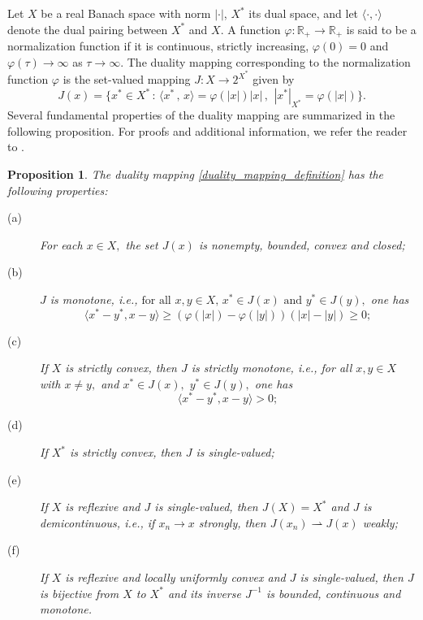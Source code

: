 \documentclass{birkjour}
\newtheorem{proposition}[theorem]{Proposition}
\theoremstyle{definition}
\theoremstyle{remark}
\numberwithin{equation}{section}
\begin{document}
Let $X$ be a real Banach space with norm $\left\vert \cdot \right\vert $, $%
X^{\ast }$ its dual space, and let $\langle \cdot ,\cdot \rangle $ denote
the dual pairing between $X^{\ast }$ and $X$. A function $\varphi \colon
\mathbb{R}_{+}\rightarrow \mathbb{R}_{+}$ is said to be a normalization
function if it is continuous, strictly increasing, $\varphi \left( 0\right)
=0$ and $\varphi \left( \tau \right) \rightarrow \infty $ as $\tau
\rightarrow \infty .$ The duality mapping corresponding to the normalization
function $\varphi $ is the set-valued mapping $J:X\rightarrow 2^{X^{\ast }}$
given by
\begin{equation}
J\left( x\right) =\{x^{\ast }\in X^{\ast }\,:\,\langle x^{\ast
}\,,\,x\rangle =\varphi (|x|)|x|\,,\ \,|x^{\ast }|_{X^{\ast }}=\varphi
(|x|)\}.  \label{duality_mapping_definition}
\end{equation}%
Several fundamental properties of the duality mapping are summarized in the
following proposition. For proofs and additional information, we refer the
reader to \cite{ic,djm,d}.

\begin{proposition}
\label{pdm} The duality mapping \eqref{duality_mapping_definition} has the
following properties:

\begin{description}
\item[(a)] For each $x\in X,$ the set $J\left( x\right) $ is nonempty,
bounded, convex and closed;

\item[(b)] $J$ is monotone, i.e., $\text{for all }x,y\in X,\,x^{\ast }\in
J(x)\text{ and }y^{\ast }\in J(y),$ one has
\begin{equation*}
\langle x^{\ast }-y^{\ast },x-y\rangle \geq \left( \varphi \left( \left\vert
x\right\vert \right) -\varphi \left( \left\vert y\right\vert \right) \right)
\left( \left\vert x\right\vert -\left\vert y\right\vert \right) \geq 0;
\end{equation*}

\item[(c)] If $X$ is strictly convex, then $J$ is strictly monotone, i.e.,
for all $x,y\in X$ with $x\neq y,$ and $x^{\ast }\in J\left( x\right) ,$ $%
y^{\ast }\in J\left( y\right) ,$ one has
\begin{equation*}
\langle x^{\ast }-y^{\ast },x-y\rangle >0;
\end{equation*}

\item[(d)] If $X^{\ast }$ is strictly convex, then $J$ is single-valued;

\item[(e)] If $X$ is reflexive and $J$ is single-valued, then $J\left(
X\right) =X^{\ast }$ and $J$ is demicontinuous, i.e., if $x_{n}\rightarrow x$
strongly, then $J\left( x_{n}\right) \rightharpoonup J\left( x\right) $
weakly;

\item[(f)] If $X$ is reflexive and locally uniformly convex and $J$ is
single-valued, then $J$ is bijective from $X$ to $X^{\ast }$ and its inverse
$J^{-1}$ is bounded, continuous and monotone.
\end{description}
\end{proposition}
\end{document}
